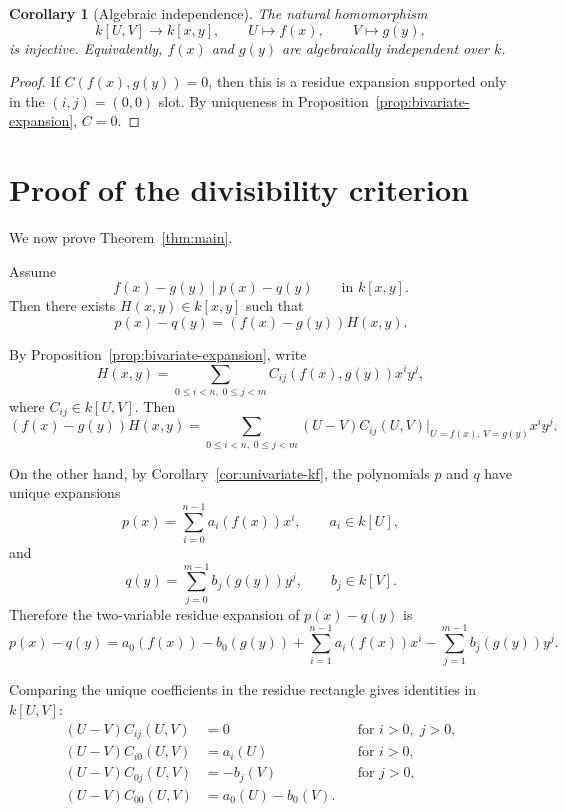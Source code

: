 \documentclass[11pt]{article}
\theoremstyle{plain}
\newtheorem{corollary}[theorem]{Corollary}
\theoremstyle{definition}
\theoremstyle{remark}
\newcommand{\U}{U}
\newcommand{\V}{V}
\begin{document}
\begin{corollary}[Algebraic independence]\label{cor:alg-independence}
The natural homomorphism
\[
    k[\U,\V]
    \longrightarrow
    k[x,y],
    \qquad
    \U\longmapsto f(x),
    \qquad
    \V\longmapsto g(y),
\]
is injective. Equivalently, \(f(x)\) and \(g(y)\) are algebraically independent over \(k\).
\end{corollary}

\begin{proof}
If \(C(f(x),g(y))=0\), then this is a residue expansion supported only in the \((i,j)=(0,0)\) slot. By uniqueness in Proposition~\ref{prop:bivariate-expansion}, \(C=0\).
\end{proof}

\section{Proof of the divisibility criterion}

We now prove Theorem~\ref{thm:main}.

Assume
\[
    f(x)-g(y)
    \mid
    p(x)-q(y)
    \qquad \text{in } k[x,y].
\]
Then there exists \(H(x,y)\in k[x,y]\) such that
\[
    p(x)-q(y)=(f(x)-g(y))H(x,y).
\]

By Proposition~\ref{prop:bivariate-expansion}, write
\[
    H(x,y)
    =
    \sum_{0\leq i<n,\;0\leq j<m}
    C_{ij}(f(x),g(y))x^i y^j,
\]
where \(C_{ij}\in k[\U,\V]\). Then
\[
    (f(x)-g(y))H(x,y)
    =
    \sum_{0\leq i<n,\;0\leq j<m}
    (\U-\V)C_{ij}(\U,\V)\big|_{\U=f(x),\,\V=g(y)}x^i y^j.
\]

On the other hand, by Corollary~\ref{cor:univariate-kf}, the polynomials \(p\) and \(q\) have unique expansions
\[
    p(x)=\sum_{i=0}^{n-1} a_i(f(x))x^i,
    \qquad a_i\in k[\U],
\]
and
\[
    q(y)=\sum_{j=0}^{m-1} b_j(g(y))y^j,
    \qquad b_j\in k[\V].
\]
Therefore the two-variable residue expansion of \(p(x)-q(y)\) is
\[
    p(x)-q(y)
    =
    a_0(f(x))-b_0(g(y))
    +
    \sum_{i=1}^{n-1}a_i(f(x))x^i
    -
    \sum_{j=1}^{m-1}b_j(g(y))y^j.
\]

Comparing the unique coefficients in the residue rectangle gives identities in \(k[\U,\V]\):
\begin{align}
    (\U-\V)C_{ij}(\U,\V)&=0
    &&\text{for } i>0,
    \;j>0, \label{eq:interior}\\
    (\U-\V)C_{i0}(\U,\V)&=a_i(\U)
    &&\text{for } i>0, \label{eq:bottom}\\
    (\U-\V)C_{0j}(\U,\V)&=-b_j(\V)
    &&\text{for } j>0, \label{eq:left}\\
    (\U-\V)C_{00}(\U,\V)&=a_0(\U)-b_0(\V). \label{eq:origin}
\end{align}
\end{document}
